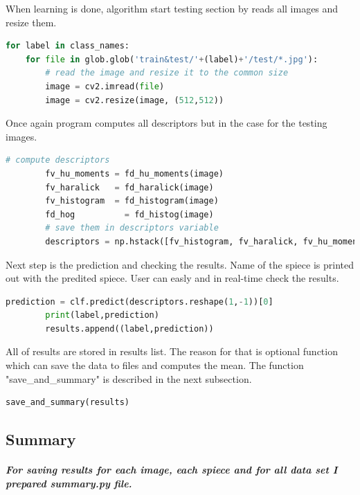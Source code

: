 \documentclass[12pt]{article}
\begin{document}
When learning is done, algorithm start testing section by reads all images and resize them.

\begin{lstlisting}[language=Python]
for label in class_names: 
    for file in glob.glob('train&test/'+(label)+'/test/*.jpg'):
        # read the image and resize it to the common size
        image = cv2.imread(file)
        image = cv2.resize(image, (512,512)) 
\end{lstlisting} 

Once again program computes all descriptors but in the case for the testing images.

\begin{lstlisting}[language=Python]
        # compute descriptors
        fv_hu_moments = fd_hu_moments(image)
        fv_haralick   = fd_haralick(image)
        fv_histogram  = fd_histogram(image)
        fd_hog          = fd_histog(image)
        # save them in descriptors variable
        descriptors = np.hstack([fv_histogram, fv_haralick, fv_hu_moments, fd_hog])
\end{lstlisting} 

Next step is the prediction and checking the results. Name of the spiece is printed out with the predited spiece. User can easly and in real-time check the results. 

\begin{lstlisting}[language=Python]
        prediction = clf.predict(descriptors.reshape(1,-1))[0]
        print(label,prediction)
        results.append((label,prediction))
\end{lstlisting} 

All of results are stored in results list. The reason for that is optional function which can save the data to files and computes the mean.
The function "save\_and\_summary" is described in the next subsection.

\begin{lstlisting}[language=Python]
save_and_summary(results)
\end{lstlisting} 

\subsection{Summary}

\subparagraph{
For saving results for each image, each spiece and for all data set I prepared summary.py file. \\\\
}
\end{document}
